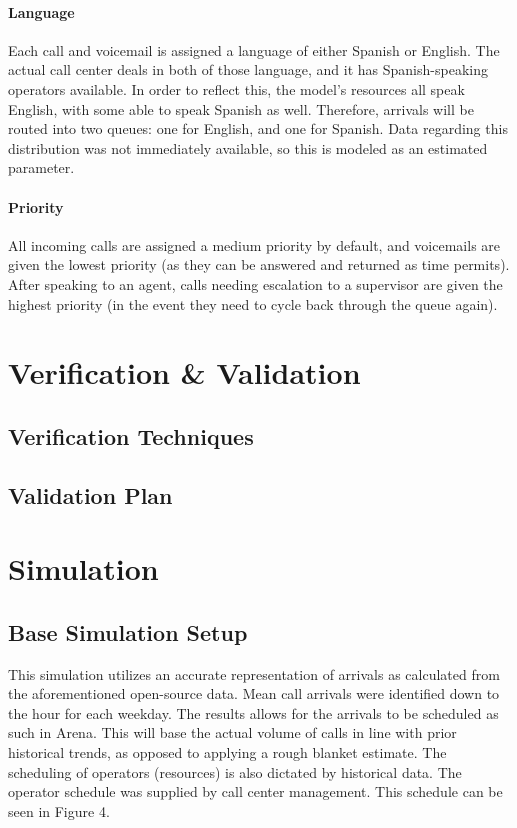 \documentclass[12pt,twocolumn]{article}
\begin{document}
	\paragraph{Language}

Each call and voicemail is assigned a language of either Spanish or English.  The actual call center deals in both of those language, and it has Spanish-speaking operators available.  In order to reflect this, the model's resources all speak English, with some able to speak Spanish as well.  Therefore, arrivals will be routed into two queues:  one for English, and one for Spanish.  Data regarding this distribution was not immediately available, so this is modeled as an estimated parameter.

	\paragraph{Priority}

All incoming calls are assigned a medium priority by default, and voicemails are given the lowest priority (as they can be answered and returned as time permits).  After speaking to an agent, calls needing escalation to a supervisor are given the highest priority (in the event they need to cycle back through the queue again).


\section{Verification \& Validation}

	\subsection{Verification Techniques}
	
	
	\subsection{Validation Plan}
	
	
\section{Simulation}

	\subsection{Base Simulation Setup}
This simulation utilizes an accurate representation of arrivals as calculated from the aforementioned open-source data.  Mean call arrivals were identified down to the hour for each weekday.  The results allows for the arrivals to be scheduled as such in Arena.  This will base the actual volume of calls in line with prior historical trends, as opposed to applying a rough blanket estimate.  The scheduling of operators (resources) is also dictated by historical data.  The operator schedule was supplied by call center management.  This schedule can be seen in Figure 4.  
\end{document}
